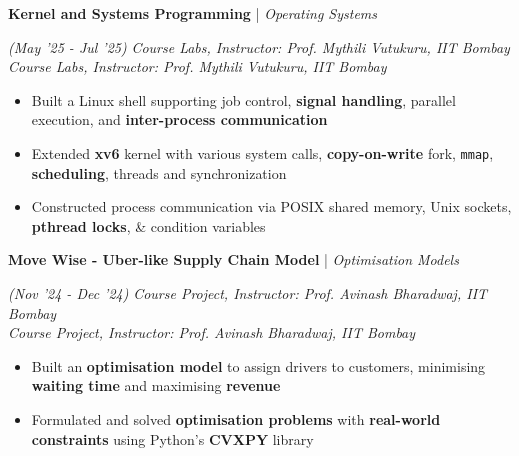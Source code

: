 \documentclass[10pt]{article}
\newcommand{\xfill}[2][1ex]{
	\dimen0=#2\advance\dimen0 by #1
	\leaders\hrule height \dimen0 depth -#1\hfill
}
\renewcommand{\section}[1]{
	\vspace{5pt}
	{\color{Blue}{\Large\scshape\raggedright #1\xfill[0pt]{0.5pt}}}
}
\renewcommand{\subsection}[4]{
	\def\temp{#4}
	\vspace{2pt}
	{
		\large
		{\color{Green} \textbf{#1}} | {\sl #2} \filldate{#3}
		\ifx\temp\empty
		\else
		{
			\\[0.098em]
			\fontsize{10.5}{13.2}\selectfont
			\sl #4
		}
		\fi
	}
}
\newcommand{\filldate}[1]{\strut\hfill {\small \textit{(#1)}}}
\begin{document}
\vspace{-5px}



\newpage
{}


\section{Other Projects}

\vspace{0px}

\subsection{Kernel and Systems Programming}{Operating Systems}{May '25 - Jul '25}{\textit{Course Labs, Instructor: Prof. Mythili Vutukuru, IIT Bombay}}
\begin{itemize}
\item Built a Linux shell supporting job control, \textbf{signal handling}, parallel execution, and \textbf{inter-process communication}
\item Extended \textbf{xv6} kernel with various system calls, \textbf{copy-on-write} fork, \texttt{mmap}, \textbf{scheduling}, threads and synchronization 
\item Constructed process communication via POSIX shared memory, Unix sockets, \textbf{pthread locks}, \& condition variables
\end{itemize}

\vspace{-14px}

\subsection{Move Wise - Uber-like Supply Chain Model}{Optimisation Models}{Nov '24 - Dec '24}{\textit{Course Project, Instructor: Prof. Avinash Bharadwaj, IIT Bombay}}  
\begin{itemize}
    \item Built an \textbf{optimisation model} to assign drivers to customers, minimising \textbf{waiting time} and maximising \textbf{revenue}
    \item Formulated and solved \textbf{optimisation problems} with \textbf{real-world constraints} using Python’s \textbf{CVXPY} library
\end{itemize}
\end{document}
